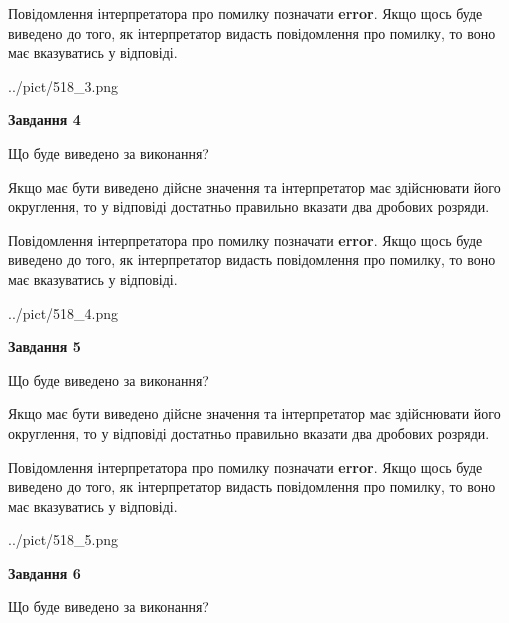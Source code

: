 \documentclass[12pt, ukrainian]{article}
\begin{document}
{\begin {Large}
Повідомлення інтерпретатора про помилку позначати \textbf{error}.
Якщо щось буде виведено до того, як інтерпретатор видасть повідомлення про помилку, 
то воно має вказуватись у відповіді. \par

\begin{center}
	{../pict/518_3.png}
\end{center}
\newpage

{\begin {center}\textbf{Завдання 4}\end {center}}\par
Що буде виведено за виконання? \par

Якщо має бути виведено дійсне значення та інтерпретатор має здійснювати його округлення, 
то у відповіді достатньо правильно вказати два дробових розряди.

Повідомлення інтерпретатора про помилку позначати \textbf{error}.
Якщо щось буде виведено до того, як інтерпретатор видасть повідомлення про помилку, 
то воно має вказуватись у відповіді. \par

\begin{center}
	{../pict/518_4.png}
\end{center}
\newpage

{\begin {center}\textbf{Завдання 5}\end {center}}\par
Що буде виведено за виконання? \par

Якщо має бути виведено дійсне значення та інтерпретатор має здійснювати його округлення, 
то у відповіді достатньо правильно вказати два дробових розряди.

Повідомлення інтерпретатора про помилку позначати \textbf{error}.
Якщо щось буде виведено до того, як інтерпретатор видасть повідомлення про помилку, 
то воно має вказуватись у відповіді. \par

\begin{center}
	{../pict/518_5.png}
\end{center}
\newpage

{\begin {center}\textbf{Завдання 6}\end {center}}\par
Що буде виведено за виконання? \par


\end{Large}}
\end{document}
